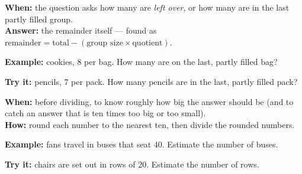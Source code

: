 \documentclass[12pt]{article}
\begin{document}
\begin{formulabox}\textbf{When:} the question asks how many are \emph{left over}, or how many
are in the last partly filled group.\\[3pt]
\textbf{Answer:} the remainder itself --- found as
$\text{remainder} = \text{total} - (\text{group size} \times \text{quotient})$.
\end{formulabox}
\begin{examplebox}\textbf{Example:} cookies, 8 per bag. How many are on the last, partly filled bag?
\end{examplebox}
\begin{tryitbox}\textbf{Try it:} pencils, 7 per pack. How many pencils are in the last, partly filled pack?\\[2pt]
\end{tryitbox}

\begin{formulabox}\textbf{When:} before dividing, to know roughly how big the answer should be
(and to catch an answer that is ten times too big or too small).\\[3pt]
\textbf{How:} round each number to the nearest ten, then divide the rounded numbers.
\end{formulabox}
\begin{examplebox}\textbf{Example:} fans travel in buses that seat 40. Estimate the number of buses.
\end{examplebox}
\begin{tryitbox}\textbf{Try it:} chairs are set out in rows of 20. Estimate the number of rows.\\[2pt]
\end{tryitbox}
\end{document}
